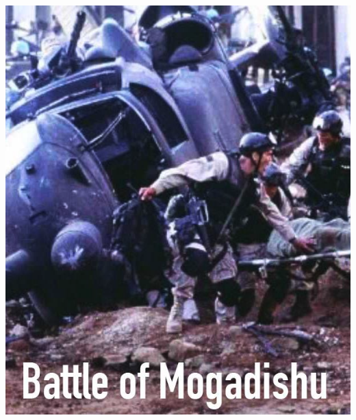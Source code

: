 \documentclass[aspectratio=43]{beamer}
\begin{document}
\begin{frame}
\begin{minipage}{.49\textwidth}
  \includegraphics[width = \textwidth]{img/mogadishu}  
\end{minipage}
  

\end{frame}
\end{document}
